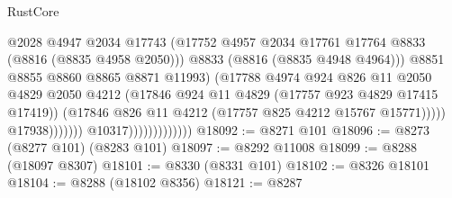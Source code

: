 \begin{lexlean}{RustCore}
\begin{coremodule}
                                                    @2028
                                                    @4947
                                                    @2034
                                                    @17743
                                                    (@17752
                                                      @4957
                                                      @2034
                                                      @17761
                                                      @17764
                                                      @8833
                                                      (@8816 (@8835 @4958 @2050)))
                                                    @8833
                                                    (@8816 (@8835 @4948 @4964)))
                                                  @8851
                                                  @8855
                                                  @8860
                                                  @8865
                                                  @8871
                                                  @11993)
                                                (@17788
                                                  @4974
                                                  @924
                                                  @826
                                                  @11
                                                  @2050
                                                  @4829
                                                  @2050
                                                  @4212
                                                  (@17846
                                                    @924
                                                    @11
                                                    @4829
                                                    (@17757 @923 @4829 @17415 @17419))
                                                  (@17846
                                                    @826
                                                    @11
                                                    @4212
                                                    (@17757 @825 @4212 @15767 @15771)))))
                                            @17938)))))))
                              @10317)))))))))))))
@18092 := @8271 @101
@18096 := @8273 (@8277 @101) (@8283 @101)
@18097 := @8292 @11008
@18099 := @8288 (@18097 @8307)
@18101 := @8330 (@8331 @101)
@18102 := @8326 @18101
@18104 := @8288 (@18102 @8356)
@18121 := @8287

\end{coremodule}
\end{lexlean}
